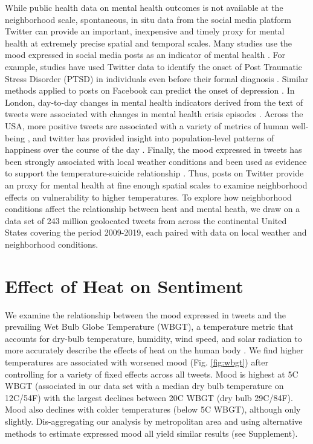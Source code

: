 \documentclass[fleqn,10pt]{wlscirep}
\begin{document}
While public health data on mental health outcomes is not available at the neighborhood scale, spontaneous, in situ data from the social media platform Twitter can provide an important, inexpensive and timely proxy for mental health at extremely precise spatial and temporal scales. Many studies use the mood expressed in social media posts as an indicator of mental health \cite{Edo-Osagie2020Jul, Sinnenberg2016Dec}. For example, studies have used Twitter data to identify the onset of Post Traumatic Stress Disorder (PTSD) in individuals even before their formal diagnosis \cite{Reece2017Oct}. Similar methods applied to posts on Facebook can predict the onset of depression \cite{Eichstaedt2018Oct}. In London, day-to-day changes in mental health indicators derived from the text of tweets were associated with changes in mental health crisis episodes \cite{Kolliakou2020Feb}. Across the USA, more positive tweets are associated with a variety of metrics of human well-being \cite{Mitchell2013May}, and twitter has provided insight into population-level patterns of happiness over the course of the day \cite{Dodds2011, Dzogang2017}. Finally, the mood expressed in tweets has been strongly associated with local weather conditions \cite{baylis_weather_2018, hannak_tweetin_2012} and been used as evidence to support the temperature-suicide relationship \cite{Burke2018Aug}. Thus, posts on Twitter provide an proxy for mental health at fine enough spatial scales to examine neighborhood effects on vulnerability to higher temperatures. To explore how neighborhood conditions affect the relationship between heat and mental heath, we draw on a data set of 243 million geolocated tweets from across the continental United States covering the period 2009-2019, each paired with data on local weather and neighborhood conditions.

\section*{Effect of Heat on Sentiment}
We examine the relationship between the mood expressed in tweets and the prevailing Wet Bulb Globe Temperature (WBGT), a temperature metric that accounts for dry-bulb temperature, humidity, wind speed, and solar radiation to more accurately describe the effects of heat on the human body \cite{budd2008wet}. We find higher temperatures are associated with worsened mood (Fig. \ref{fig:wbgt}) after controlling for a variety of fixed effects across all tweets. Mood is highest at 5\textdegree C WBGT (associated in our data set with a median dry bulb temperature on 12\textdegree C/54\textdegree F) with the largest declines between 20\textdegree C WBGT (dry bulb 29\textdegree C/84\textdegree F). Mood also declines with colder temperatures (below 5\textdegree C WBGT), although only slightly. Dis-aggregating our analysis by metropolitan area and using alternative methods to estimate expressed mood all yield similar results (see Supplement).
\end{document}
